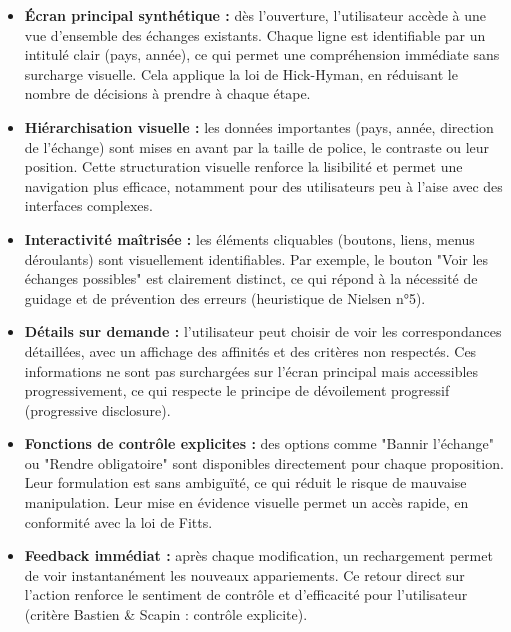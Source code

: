 \documentclass{mytex}
\begin{document}
\begin{itemize}
	\item \textbf{Écran principal synthétique :} dès l’ouverture, l’utilisateur accède à une vue d’ensemble des échanges existants. Chaque ligne est identifiable par un intitulé clair (pays, année), ce qui permet une compréhension immédiate sans surcharge visuelle. Cela applique la loi de Hick-Hyman, en réduisant le nombre de décisions à prendre à chaque étape.
	
	\item \textbf{Hiérarchisation visuelle :} les données importantes (pays, année, direction de l’échange) sont mises en avant par la taille de police, le contraste ou leur position. Cette structuration visuelle renforce la lisibilité et permet une navigation plus efficace, notamment pour des utilisateurs peu à l’aise avec des interfaces complexes.
	
	\item \textbf{Interactivité maîtrisée :} les éléments cliquables (boutons, liens, menus déroulants) sont visuellement identifiables. Par exemple, le bouton "Voir les échanges possibles" est clairement distinct, ce qui répond à la nécessité de guidage et de prévention des erreurs (heuristique de Nielsen n°5).
	
	\item \textbf{Détails sur demande :} l’utilisateur peut choisir de voir les correspondances détaillées, avec un affichage des affinités et des critères non respectés. Ces informations ne sont pas surchargées sur l’écran principal mais accessibles progressivement, ce qui respecte le principe de dévoilement progressif (progressive disclosure).
	
	\item \textbf{Fonctions de contrôle explicites :} des options comme "Bannir l’échange" ou "Rendre obligatoire" sont disponibles directement pour chaque proposition. Leur formulation est sans ambiguïté, ce qui réduit le risque de mauvaise manipulation. Leur mise en évidence visuelle permet un accès rapide, en conformité avec la loi de Fitts.
	
	\item \textbf{Feedback immédiat :} après chaque modification, un rechargement permet de voir instantanément les nouveaux appariements. Ce retour direct sur l’action renforce le sentiment de contrôle et d’efficacité pour l’utilisateur (critère Bastien \& Scapin : contrôle explicite).
\end{itemize}

\end{document}
